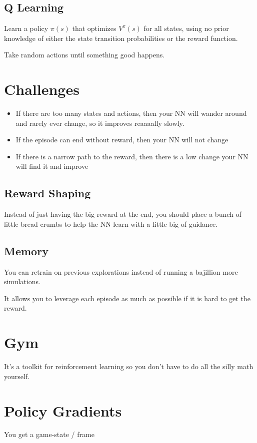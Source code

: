 \documentclass[fleqn]{report}
\begin{document}
\subsection{Q Learning}
Learn a policy $\pi(s)$ that optimizes $V^{\pi}(s)$ for all states, 
using no prior knowledge of either the state transition probabilities or the 
reward function. 

Take random actions until something good happens. 

\section{Challenges}
\begin{itemize}
\item
If there are too many states and actions, then your NN will wander 
around and rarely ever change, so it improves reaaaally slowly. 
\item
If the episode can end without reward, then your NN will not change 
\item
If there is a narrow path to the reward, then there is a low change 
your NN will find it and improve 
\end{itemize}

\subsection{Reward Shaping}
Instead of just having the big reward at the end, you should place a bunch 
of little bread crumbs to help the NN learn with a little big of guidance. 

\subsection{Memory}
You can retrain on previous explorations instead of running a bajillion more 
simulations. 

It allows you to leverage each episode as much as possible if it is hard 
to get the reward. 

\section{Gym}
It's a toolkit for reinforcement learning so you don't have to do all the silly 
math yourself.

\section{Policy Gradients}
You get a game-state / frame 
\end{document}
